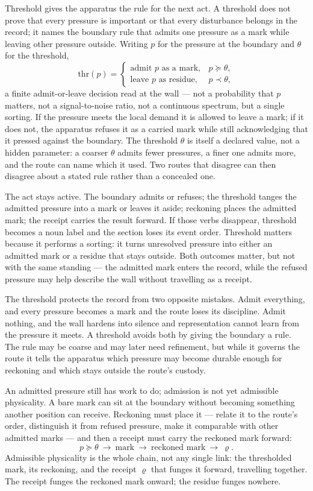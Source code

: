 Threshold gives the apparatus the rule for the next act. A threshold does not prove that every pressure is important or that every disturbance belongs in the record; it names the boundary rule that admits one pressure as a mark while leaving other pressure outside. Writing $p$ for the pressure at the boundary and $\theta$ for the threshold,
\[ \mathrm{thr}(p) = \begin{cases} \text{admit } p \text{ as a mark}, & p \succeq \theta,\\[2pt] \text{leave } p \text{ as residue}, & p \prec \theta, \end{cases} \]
a finite admit-or-leave decision read at the wall --- not a probability that $p$ matters, not a signal-to-noise ratio, not a continuous spectrum, but a single sorting. If the pressure meets the local demand it is allowed to leave a mark; if it does not, the apparatus refuses it as a carried mark while still acknowledging that it pressed against the boundary. The threshold $\theta$ is itself a declared value, not a hidden parameter: a coarser $\theta$ admits fewer pressures, a finer one admits more, and the route can name which it used. Two routes that disagree can then disagree about a stated rule rather than a concealed one.

The act stays active. The boundary admits or refuses; the threshold tanges the admitted pressure into a mark or leaves it aside; reckoning places the admitted mark; the receipt carries the result forward. If those verbs disappear, threshold becomes a noun label and the section loses its event order. Threshold matters because it performs a sorting: it turns unresolved pressure into either an admitted mark or a residue that stays outside. Both outcomes matter, but not with the same standing --- the admitted mark enters the record, while the refused pressure may help describe the wall without travelling as a receipt.

The threshold protects the record from two opposite mistakes. Admit everything, and every pressure becomes a mark and the route loses its discipline. Admit nothing, and the wall hardens into silence and representation cannot learn from the pressure it meets. A threshold avoids both by giving the boundary a rule. The rule may be coarse and may later need refinement, but while it governs the route it tells the apparatus which pressure may become durable enough for reckoning and which stays outside the route's custody.

An admitted pressure still has work to do; admission is not yet admissible physicality. A bare mark can sit at the boundary without becoming something another position can receive. Reckoning must place it --- relate it to the route's order, distinguish it from refused pressure, make it comparable with other admitted marks --- and then a receipt must carry the reckoned mark forward:
\[ p \succeq \theta \ \longrightarrow\ \text{mark} \ \longrightarrow\ \text{reckoned mark} \ \longrightarrow\ \varrho. \]
Admissible physicality is the whole chain, not any single link: the thresholded mark, its reckoning, and the receipt $\varrho$ that funges it forward, travelling together. The receipt funges the reckoned mark onward; the residue funges nowhere.

